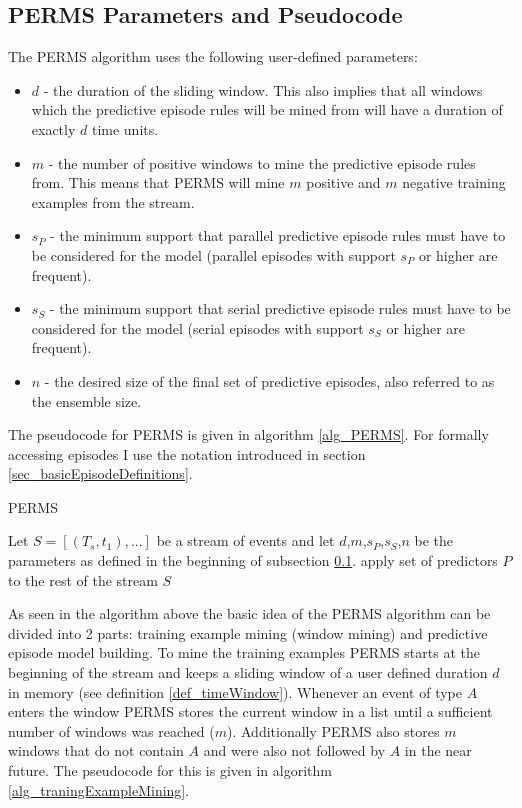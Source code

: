 \subsection{PERMS Parameters and Pseudocode}
\label{subsec_perms}

The PERMS algorithm uses the following user-defined parameters:

\begin{itemize}
	\item \textbf{$d$} - the duration of the sliding window. This also implies that all windows which the predictive episode rules will be mined from will have a duration of exactly $d$ time units.
	\item \textbf{$m$} - the number of positive windows to mine the predictive episode rules from. This means that PERMS will mine $m$ positive and $m$ negative training examples from the stream.
	\item \textbf{$s_P$} - the minimum support that parallel predictive episode rules must have to be considered for the model (parallel episodes with support $s_P$ or higher are frequent).
	\item \textbf{$s_S$} - the minimum support that serial predictive episode rules must have to be considered for the model (serial episodes with support $s_S$ or higher are frequent).
	\item \textbf{$n$} - the desired size of the final set of predictive episodes, also referred to as the ensemble size.
\end{itemize}

The pseudocode for PERMS is given in algorithm \ref{alg_PERMS}. For formally accessing episodes I use the notation introduced in section \ref{sec_basicEpisodeDefinitions}.

\begin{algorithm}[H]
  \caption{PERMS
    \label{alg_PERMS}}
  \begin{algorithmic}[1]
    \Statex
    \Require Let $S=[(T_s,t_1),...]$ be a stream of events and let $d$,$m$,$s_P$,$s_S$,$n$ be the parameters as defined in the beginning of subsection \ref{subsec_perms}.
      \State apply set of predictors $P$ to the rest of the stream $S$
    \EndFunction
  \end{algorithmic}
\end{algorithm}

As seen in the algorithm above the basic idea of the PERMS algorithm can be divided into 2 parts: training example mining (window mining) and predictive episode model building. To mine the training examples PERMS starts at the beginning of the stream and keeps a sliding window of a user defined duration $d$ in memory (see definition \ref{def_timeWindow}). Whenever an event of type $A$ enters the window PERMS stores the current window in a list until a sufficient number of windows was reached ($m$). Additionally PERMS also stores $m$ windows that do not contain $A$ and were also not followed by $A$ in the near future. The pseudocode for this is given in algorithm \ref{alg_traningExampleMining}.

